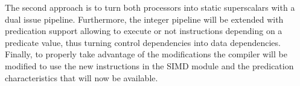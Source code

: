 \medbreak
The second approach is to turn both processors into static 
superscalars with a dual issue pipeline. Furthermore, the integer pipeline will 
be extended with predication support allowing to execute or not instructions 
depending on a predicate value, thus turning control dependencies into data 
dependencies.  Finally, to properly take advantage of the modifications the 
compiler will be modified to use the new instructions in the SIMD module and the
predication characteristics that will now be available. 
